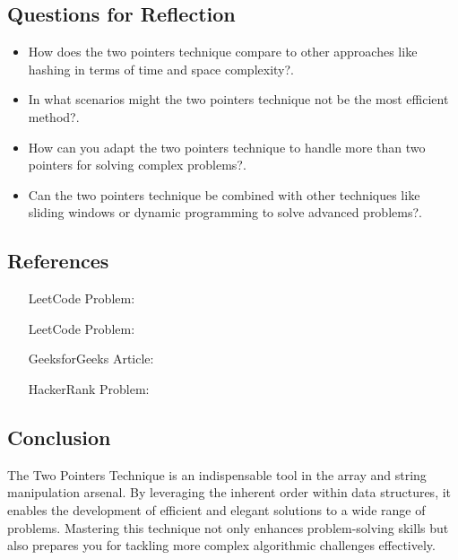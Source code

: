 \subsection*{Questions for Reflection}
\begin{itemize}
    \item How does the two pointers technique compare to other approaches like hashing in terms of time and space complexity?.
    \item In what scenarios might the two pointers technique not be the most efficient method?.
    \item How can you adapt the two pointers technique to handle more than two pointers for solving complex problems?.
    \item Can the two pointers technique be combined with other techniques like sliding windows or dynamic programming to solve advanced problems?.
\end{itemize}

\subsection*{References}
\begin{itemize}
    \item [LeetCode Problem:] 
    \item [LeetCode Problem:] 
    \item [GeeksforGeeks Article:] 
    \item [HackerRank Problem:] 
\end{itemize}

\subsection*{Conclusion}
The Two Pointers Technique is an indispensable tool in the array and string manipulation arsenal. By leveraging the inherent order within data structures, it enables the development of efficient and elegant solutions to a wide range of problems. Mastering this technique not only enhances problem-solving skills but also prepares you for tackling more complex algorithmic challenges effectively.